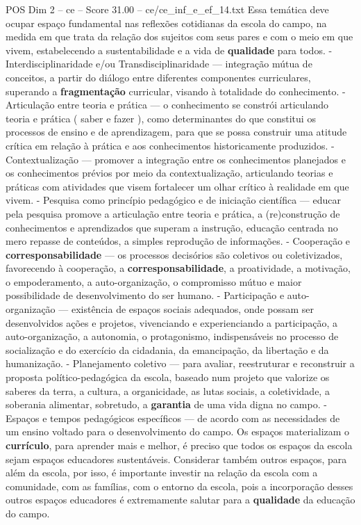 \begin{textsample}{POS Dim 2 – ce – Score 31.00 – ce/ce\_inf\_e\_ef\_14.txt}
Essa temática deve ocupar espaço fundamental nas reflexões cotidianas da escola do campo, na medida em que trata da relação dos sujeitos com seus pares e com o meio em que vivem, estabelecendo a sustentabilidade e a vida de \textbf{qualidade} para todos. - Interdisciplinaridade e/ou Transdisciplinaridade — integração mútua de conceitos, a partir do diálogo entre diferentes componentes curriculares, superando a \textbf{fragmentação} curricular, visando à totalidade do conhecimento. - Articulação entre teoria e prática — o conhecimento se constrói articulando teoria e prática ( saber e fazer ), como determinantes do que constitui os processos de ensino e de aprendizagem, para que se possa construir uma atitude crítica em relação à prática e aos conhecimentos historicamente produzidos. - Contextualização — promover a integração entre os conhecimentos planejados e os conhecimentos prévios por meio da contextualização, articulando teorias e práticas com atividades que visem fortalecer um olhar crítico à realidade em que vivem. - Pesquisa como princípio pedagógico e de iniciação científica — educar pela pesquisa promove a articulação entre teoria e prática, a (re)construção de conhecimentos e aprendizados que superam a instrução, educação centrada no mero repasse de conteúdos, a simples reprodução de informações. - Cooperação e \textbf{corresponsabilidade} — os processos decisórios são coletivos ou coletivizados, favorecendo à cooperação, a \textbf{corresponsabilidade}, a proatividade, a motivação, o empoderamento, a auto-organização, o compromisso mútuo e maior possibilidade de desenvolvimento do ser humano. - Participação e auto-organização — existência de espaços sociais adequados, onde possam ser desenvolvidos ações e projetos, vivenciando e experienciando a participação, a auto-organização, a autonomia, o protagonismo, indispensáveis no processo de socialização e do exercício da cidadania, da emancipação, da libertação e da humanização. - Planejamento coletivo — para avaliar, reestruturar e reconstruir a proposta político-pedagógica da escola, baseado num projeto que valorize os saberes da terra, a cultura, a organicidade, as lutas sociais, a coletividade, a soberania alimentar, sobretudo, a \textbf{garantia} de uma vida digna no campo. - Espaços e tempos pedagógicos específicos — de acordo com as necessidades de um ensino voltado para o desenvolvimento do campo.
Os espaços materializam o \textbf{currículo}, para aprender mais e melhor, é preciso que todos os espaços da escola sejam espaços educadores sustentáveis.
Considerar também outros espaços, para além da escola, por isso, é importante investir na relação da escola com a comunidade, com as famílias, com o entorno da escola, pois a incorporação desses outros espaços educadores é extremamente salutar para a \textbf{qualidade} da educação do campo.

\end{textsample}
